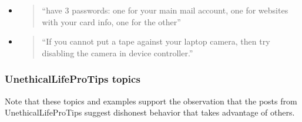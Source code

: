 \documentclass{amsart}
\theoremstyle{definition}
\theoremstyle{remark}
\newcommand{\tql}{\textquotedblleft}
\newcommand{\tqr}{\textquotedblright}
\begin{document}
\begin{enumerate}
\begin{itemize}

\item \begin{quote}
\tql have 3 passwords: one for your main mail account, one for websites with your card info, one for the other\tqr
\end{quote}
%

\item \begin{quote}
\tql If you cannot put a tape against your laptop camera, then try disabling the camera in device controller.\tqr
\end{quote}

\end{itemize}

\end{enumerate}

\subsubsection{UnethicalLifeProTips topics} Note that these topics and examples support the observation that the posts from UnethicalLifeProTips suggest dishonest behavior that takes advantage of others.
\end{document}

